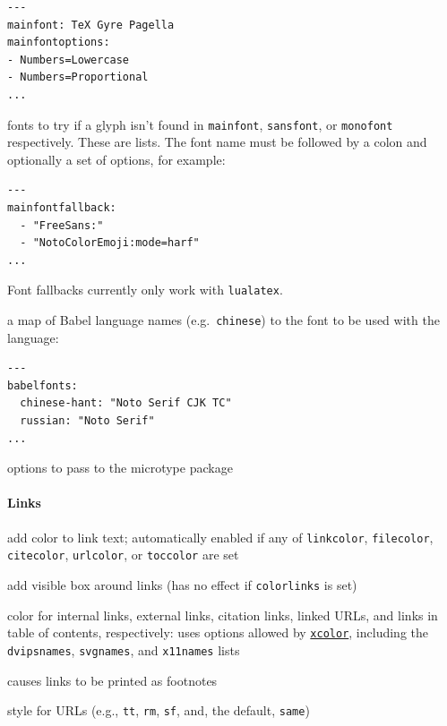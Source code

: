 \documentclass[
]{article}
\providecommand{\tightlist}{%
  \setlength{\itemsep}{0pt}\setlength{\parskip}{0pt}}
\begin{document}
\begin{description}
\begin{verbatim}
---
mainfont: TeX Gyre Pagella
mainfontoptions:
- Numbers=Lowercase
- Numbers=Proportional
...
\end{verbatim}
\item[\texttt{mainfontfallback}, \texttt{sansfontfallback},
\texttt{monofontfallback}]
fonts to try if a glyph isn't found in \texttt{mainfont},
\texttt{sansfont}, or \texttt{monofont} respectively. These are lists.
The font name must be followed by a colon and optionally a set of
options, for example:

\begin{verbatim}
---
mainfontfallback:
  - "FreeSans:"
  - "NotoColorEmoji:mode=harf"
...
\end{verbatim}

Font fallbacks currently only work with \texttt{lualatex}.
\item[\texttt{babelfonts}]
a map of Babel language names (e.g.~\texttt{chinese}) to the font to be
used with the language:

\begin{verbatim}
---
babelfonts:
  chinese-hant: "Noto Serif CJK TC"
  russian: "Noto Serif"
...
\end{verbatim}
\item[\texttt{microtypeoptions}]
options to pass to the microtype package
\end{description}

\hypertarget{links}{%
\paragraph{Links}\label{links}}

\begin{description}
\tightlist
\item[\texttt{colorlinks}]
add color to link text; automatically enabled if any of
\texttt{linkcolor}, \texttt{filecolor}, \texttt{citecolor},
\texttt{urlcolor}, or \texttt{toccolor} are set
\item[\texttt{boxlinks}]
add visible box around links (has no effect if \texttt{colorlinks} is
set)
\item[\texttt{linkcolor}, \texttt{filecolor}, \texttt{citecolor},
\texttt{urlcolor}, \texttt{toccolor}]
color for internal links, external links, citation links, linked URLs,
and links in table of contents, respectively: uses options allowed by
\href{https://ctan.org/pkg/xcolor}{\texttt{xcolor}}, including the
\texttt{dvipsnames}, \texttt{svgnames}, and \texttt{x11names} lists
\item[\texttt{links-as-notes}]
causes links to be printed as footnotes
\item[\texttt{urlstyle}]
style for URLs (e.g., \texttt{tt}, \texttt{rm}, \texttt{sf}, and, the
default, \texttt{same})
\end{description}
\end{document}
